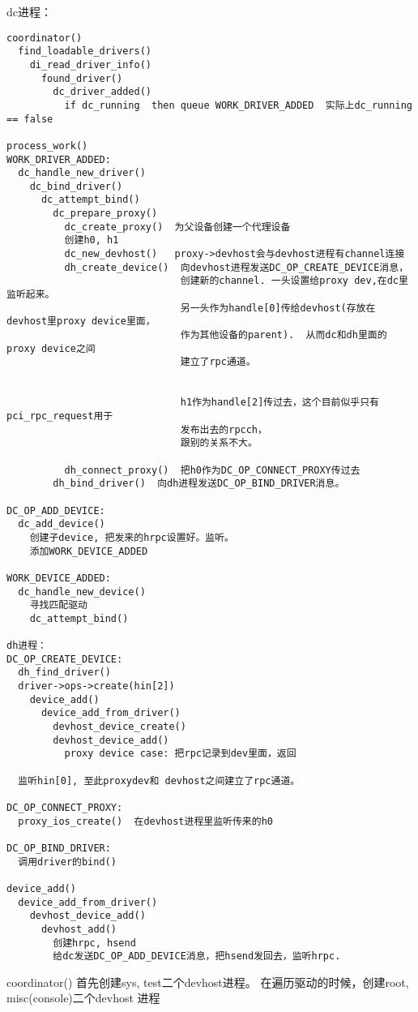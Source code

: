 dc进程：
\begin{verbatim}
coordinator()
  find_loadable_drivers()
    di_read_driver_info()
      found_driver()
        dc_driver_added()
          if dc_running  then queue WORK_DRIVER_ADDED  实际上dc_running == false

process_work()
WORK_DRIVER_ADDED:
  dc_handle_new_driver()
    dc_bind_driver()
      dc_attempt_bind()
        dc_prepare_proxy()
          dc_create_proxy()  为父设备创建一个代理设备
          创建h0, h1
          dc_new_devhost()   proxy->devhost会与devhost进程有channel连接
          dh_create_device()  向devhost进程发送DC_OP_CREATE_DEVICE消息，
                              创建新的channel. 一头设置给proxy dev,在dc里监听起来。
                              另一头作为handle[0]传给devhost(存放在devhost里proxy device里面，
                              作为其他设备的parent).  从而dc和dh里面的proxy device之间
                              建立了rpc通道。


                              h1作为handle[2]传过去，这个目前似乎只有pci_rpc_request用于
                              发布出去的rpcch，
                              跟别的关系不大。

          dh_connect_proxy()  把h0作为DC_OP_CONNECT_PROXY传过去
        dh_bind_driver()  向dh进程发送DC_OP_BIND_DRIVER消息。

DC_OP_ADD_DEVICE:
  dc_add_device()
    创建子device, 把发来的hrpc设置好。监听。
    添加WORK_DEVICE_ADDED

WORK_DEVICE_ADDED:
  dc_handle_new_device()
    寻找匹配驱动
    dc_attempt_bind()
                
dh进程：
DC_OP_CREATE_DEVICE:
  dh_find_driver()
  driver->ops->create(hin[2])
    device_add()
      device_add_from_driver()
        devhost_device_create()
        devhost_device_add()
          proxy device case: 把rpc记录到dev里面，返回
          
  监听hin[0], 至此proxydev和 devhost之间建立了rpc通道。

DC_OP_CONNECT_PROXY:
  proxy_ios_create()  在devhost进程里监听传来的h0

DC_OP_BIND_DRIVER:
  调用driver的bind()

device_add()
  device_add_from_driver()
    devhost_device_add()
      devhost_add()
        创建hrpc, hsend
        给dc发送DC_OP_ADD_DEVICE消息，把hsend发回去，监听hrpc.

\end{verbatim}

coordinator()
首先创建sys, test二个devhost进程。
在遍历驱动的时候，创建root, misc(console)二个devhost 进程

